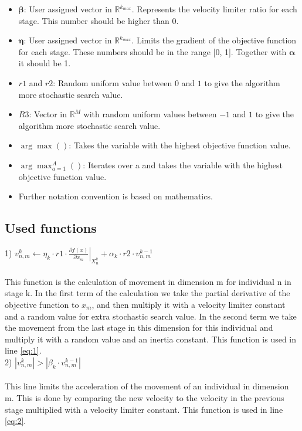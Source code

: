 \documentclass[runningheads]{llncs}
\begin{document}
\begin{itemize}
    \item $\boldsymbol{\beta}$: User assigned vector in $\mathds{R}^{k_{max}}$. Represents the velocity limiter ratio for each stage. This number should be higher than 0.
    \item $\boldsymbol{\eta}$: User assigned vector in $\mathds{R}^{k_{max}}$. Limits the gradient of the objective function for each stage. These numbers should be in the range [0, 1]. Together with $\boldsymbol{\alpha}$ it should be 1.
    \item $ r1 $ and $r2 $: Random uniform value between $ 0 $ and $ 1$ to give the algorithm more stochastic search value.
    \item $ R3 $: Vector in $\mathds{R}^M$ with random uniform values between $ -1 $ and $ 1$ to give the algorithm more stochastic search value.
    \item $\arg \max() $: Takes the variable with the highest objective function value.
    \item $\arg \max_{a=1}^A()$: Iterates over a and takes the variable with the highest objective function value.
    \item Further notation convention is based on mathematics.
\end{itemize}

\subsection{Used functions}

1) $
v_{n,m}^k \leftarrow \eta _k \cdot r1 \cdot  \left. \frac{\partial f(x)}{\partial x_m} \right \rvert_{X_{n}^k} + \alpha_k \cdot r2 \cdot v_{n,m}^{k-1}
$ \\ \\
This function is the calculation of movement in dimension m for individual n in stage k. In the first term of the calculation we take the partial derivative of the objective function to $x_m$, and then multiply it with a velocity limiter constant and a random value for extra stochastic search value. In the second term we take the movement from the last stage in this dimension for this individual and multiply it with a random value and an inertia constant. This function is used in line \ref{eq:1}. \\ 

2) $
\left \lvert v_{n,m}^k \right \rvert  > \left \lvert \beta_k \cdot v_{n,m}^{k-1} \right \rvert
$ \\ \\
This line limits the acceleration of the movement of an individual in dimension m. This is done by comparing the new velocity to the velocity in the previous stage multiplied with a velocity limiter constant. This function is used in line \ref{eq:2}. \\ 
\end{document}
